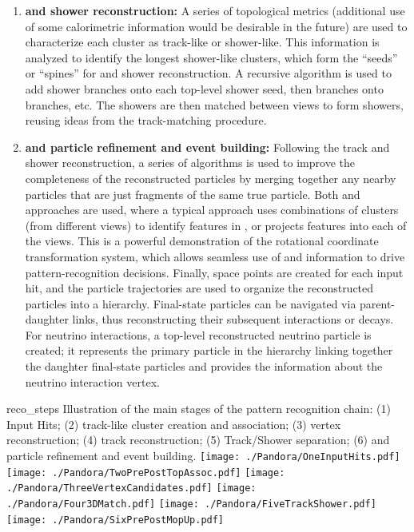 \begin{enumerate}
\item{\bf \twod and \threed shower reconstruction:} A series of topological metrics (additional use of some calorimetric information would be desirable in the future) are used to characterize each \twod cluster as track-like or shower-like. This information is analyzed to identify the longest shower-like clusters, which form the ``seeds'' or ``spines'' for \twod and \threed shower reconstruction. A recursive algorithm is used to add shower branches onto each top-level shower seed, then branches onto branches, etc. The \twod showers are then matched between views to form \threed showers, reusing ideas from the \threed track-matching procedure.
\item{\bf \twod and \threed particle refinement and event building:} Following the \threed track and shower reconstruction, a series of algorithms is used to improve the completeness of the reconstructed particles by merging together any nearby particles that are just fragments of the same true particle. Both \twod and \threed approaches are used, %
where a typical approach uses combinations of \twod clusters (from different views) to identify features in \threed, or projects \threed features into each of the \twod views. This is a powerful demonstration of the  rotational coordinate transformation system, which allows seamless use of \twod and \threed information to drive pattern-recognition decisions. Finally, \threed space points are created for each \twod input hit, and the \threed particle trajectories are used to organize the reconstructed particles into a hierarchy. Final-state particles can be navigated via parent-daughter links, thus reconstructing their subsequent interactions or decays. For neutrino interactions, a top-level reconstructed neutrino particle is created; it represents the primary particle in the hierarchy linking together the daughter final-state particles and provides the information about the neutrino interaction vertex.

\end{enumerate}

\begin{dunefigure}
{reco_steps}
{Illustration of the main stages of the  pattern recognition chain: (1) Input Hits; (2) \twod track-like cluster creation and association; (3) \threed vertex reconstruction; (4) \threed track reconstruction; (5) Track/Shower separation; (6) \twod and \threed particle refinement and event building.}
\texttt{[image: ./Pandora/OneInputHits.pdf]}
\texttt{[image: ./Pandora/TwoPrePostTopAssoc.pdf]}
\texttt{[image: ./Pandora/ThreeVertexCandidates.pdf]}
\texttt{[image: ./Pandora/Four3DMatch.pdf]}
\texttt{[image: ./Pandora/FiveTrackShower.pdf]}
\texttt{[image: ./Pandora/SixPrePostMopUp.pdf]}
\end{dunefigure}


